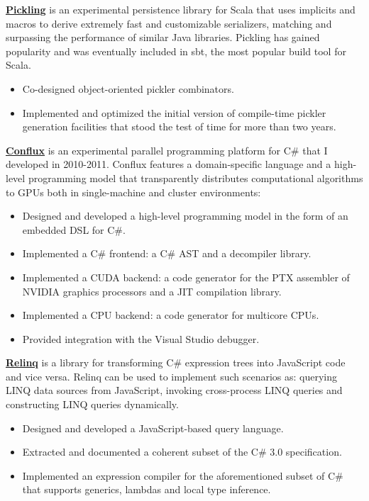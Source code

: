 \documentclass[margin, 10pt]{Stylesheet}
\begin{document}
\begin{resume}
\textbf{\href{https://github.com/scala/pickling}{Pickling}} is an experimental persistence library
for Scala that uses implicits and macros to derive extremely fast and customizable serializers,
matching and surpassing the performance of similar Java libraries. Pickling has gained popularity
and was eventually included in sbt, the most popular build tool for Scala.

\begin{itemize} \itemsep -2pt
\item Co-designed object-oriented pickler combinators.
\item Implemented and optimized the initial version of compile-time pickler generation facilities
that stood the test of time for more than two years.
\end{itemize}

\textbf{\href{http://code.google.com/p/conflux/}{Conflux}} is an experimental parallel programming
platform for C\# that I developed in 2010-2011. Conflux features a domain-specific language and
a high-level programming model that transparently distributes computational algorithms to GPUs both
in single-machine and cluster environments:

\begin{itemize} \itemsep -2pt
\item Designed and developed a high-level programming model in the form of an embedded DSL for C\#.
\item Implemented a C\# frontend: a C\# AST and a decompiler library.
\item Implemented a CUDA backend: a code generator for the PTX assembler of NVIDIA graphics processors
and a JIT compilation library.
\item Implemented a CPU backend: a code generator for multicore CPUs.
\item Provided integration with the Visual Studio debugger.
\end{itemize}

\textbf{\href{http://code.google.com/p/relinq/}{Relinq}} is a library for transforming C\#
expression trees into JavaScript code and vice versa. Relinq can be used to implement such scenarios
as: querying LINQ data sources from JavaScript, invoking cross-process LINQ queries and constructing
LINQ queries dynamically.

\begin{itemize} \itemsep -2pt
\item Designed and developed a JavaScript-based query language.
\item Extracted and documented a coherent subset of the C\# 3.0 specification.
\item Implemented an expression compiler for the aforementioned subset of C\# that supports generics,
lambdas and local type inference.
\end{itemize}


\end{resume}
\end{document}
